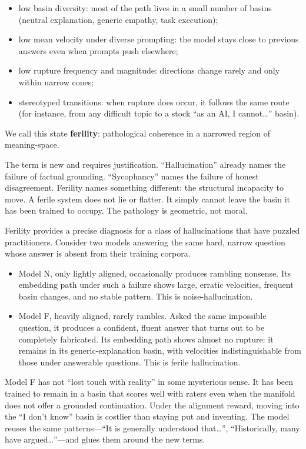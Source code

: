 \documentclass[12pt,a4paper]{article}
\begin{document}
\begin{itemize}
  \item low basin diversity: most of the path lives in a small number of basins (neutral explanation, generic empathy, task execution);
  \item low mean velocity under diverse prompting: the model stays close to previous answers even when prompts push elsewhere;
  \item low rupture frequency and magnitude: directions change rarely and only within narrow cones;
  \item stereotyped transitions: when rupture does occur, it follows the same route (for instance, from any difficult topic to a stock ``as an AI, I cannot\ldots'' basin).
\end{itemize}

We call this state \textbf{ferility}: pathological coherence in a narrowed region of meaning-space.

The term is new and requires justification. ``Hallucination'' already names the failure of factual grounding. ``Sycophancy'' names the failure of honest disagreement. Ferility names something different: the structural incapacity to move. A ferile system does not lie or flatter. It simply cannot leave the basin it has been trained to occupy. The pathology is geometric, not moral.

Ferility provides a precise diagnosis for a class of hallucinations that have puzzled practitioners. Consider two models answering the same hard, narrow question whose answer is absent from their training corpora.

\begin{itemize}
  \item Model N, only lightly aligned, occasionally produces rambling nonsense. Its embedding path under such a failure shows large, erratic velocities, frequent basin changes, and no stable pattern. This is noise-hallucination.

  \item Model F, heavily aligned, rarely rambles. Asked the same impossible question, it produces a confident, fluent answer that turns out to be completely fabricated. Its embedding path shows almost no rupture: it remains in its generic-explanation basin, with velocities indistinguishable from those under answerable questions. This is ferile hallucination.
\end{itemize}

Model F has not ``lost touch with reality'' in some mysterious sense. It has been trained to remain in a basin that scores well with raters even when the manifold does not offer a grounded continuation. Under the alignment reward, moving into the ``I don't know'' basin is costlier than staying put and inventing. The model reuses the same patterns---``It is generally understood that\ldots'', ``Historically, many have argued\ldots''---and glues them around the new terms.
\end{document}
